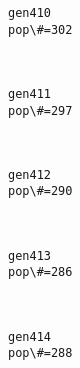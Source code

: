 \documentclass[11pt]{article}
\begin{document}
    \begin{Verbatim}[commandchars=\\\{\}]
gen410
pop\#=302

    \end{Verbatim}

    \begin{center}
    \end{center}
    { \hspace*{\fill} \\}
    
    \begin{Verbatim}[commandchars=\\\{\}]
gen411
pop\#=297

    \end{Verbatim}

    \begin{center}
    \end{center}
    { \hspace*{\fill} \\}
    
    \begin{Verbatim}[commandchars=\\\{\}]
gen412
pop\#=290

    \end{Verbatim}

    \begin{center}
    \end{center}
    { \hspace*{\fill} \\}
    
    \begin{Verbatim}[commandchars=\\\{\}]
gen413
pop\#=286

    \end{Verbatim}

    \begin{center}
    \end{center}
    { \hspace*{\fill} \\}
    
    \begin{Verbatim}[commandchars=\\\{\}]
gen414
pop\#=288

    \end{Verbatim}
\end{document}
